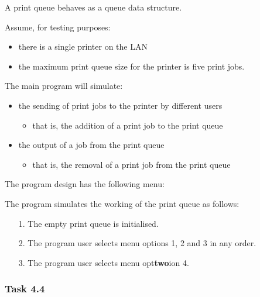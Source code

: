 A print queue behaves as a queue data structure. 

Assume, for testing purposes: 
\begin{itemize}
\item there is a single printer on the LAN 
\item the maximum print queue size for the printer is five print jobs. 
\end{itemize}
The main program will simulate: 
\begin{itemize}
\item the sending of print jobs to the printer by different users 
\begin{itemize}
\item that is, the addition of a print job to the print queue 
\end{itemize}
\item the output of a job from the print queue 
\begin{itemize}
\item that is, the removal of a print job from the print queue 
\end{itemize}
\end{itemize}
The program design has the following menu: 
\begin{center}
\noindent{}
\par\end{center}

The program simulates the working of the print queue as follows: 
\begin{enumerate}
\item[1.] The empty print queue is initialised. 
\item[2.]  The program user selects menu options 1, 2 and 3 in any order. 
\item[3.]  The program user selects menu opt\textbf{two}ion 4.
\end{enumerate}

\subsubsection*{Task 4.4}

